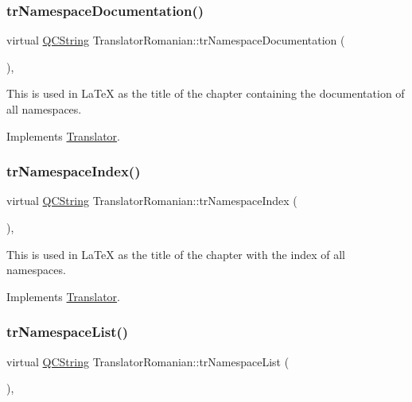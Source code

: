 \subsubsection{\texorpdfstring{trNamespaceDocumentation()}{trNamespaceDocumentation()}}
{\footnotesize\ttfamily virtual \mbox{\hyperlink{class_q_c_string}{Q\+C\+String}} Translator\+Romanian\+::tr\+Namespace\+Documentation (\begin{DoxyParamCaption}{ }\end{DoxyParamCaption})\hspace{0.3cm}{\ttfamily [inline]}, {\ttfamily [virtual]}}

This is used in La\+TeX as the title of the chapter containing the documentation of all namespaces. 

Implements \mbox{\hyperlink{class_translator}{Translator}}.

\mbox{\label{class_translator_romanian_a53b45c25a0bfd71e27a22c93de29c040}} 
\subsubsection{\texorpdfstring{trNamespaceIndex()}{trNamespaceIndex()}}
{\footnotesize\ttfamily virtual \mbox{\hyperlink{class_q_c_string}{Q\+C\+String}} Translator\+Romanian\+::tr\+Namespace\+Index (\begin{DoxyParamCaption}{ }\end{DoxyParamCaption})\hspace{0.3cm}{\ttfamily [inline]}, {\ttfamily [virtual]}}

This is used in La\+TeX as the title of the chapter with the index of all namespaces. 

Implements \mbox{\hyperlink{class_translator}{Translator}}.

\mbox{\label{class_translator_romanian_af527a86dacffc2a704ae967949ad49ae}} 
\subsubsection{\texorpdfstring{trNamespaceList()}{trNamespaceList()}}
{\footnotesize\ttfamily virtual \mbox{\hyperlink{class_q_c_string}{Q\+C\+String}} Translator\+Romanian\+::tr\+Namespace\+List (\begin{DoxyParamCaption}{ }\end{DoxyParamCaption})\hspace{0.3cm}{\ttfamily [inline]}, {\ttfamily [virtual]}}


